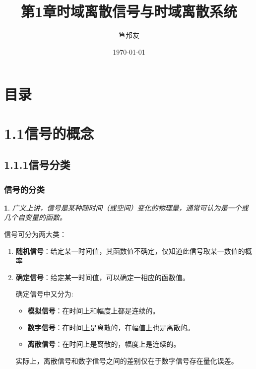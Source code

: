 \documentclass[notheorems,compress,mathserif,table]{beamer}
\title{\heiti 第1章\quad 时域离散信号与时域离散系统}
\author[\textcolor{blue}]{{\sihao\kaishu  笪邦友}}
\institute{\sihao\lishu  \textcolor{violet}{中南民族大学~~ 电子信息工程学院}}
\date{\fangsong\today}
\newtheorem{dablock}{}
\begin{document}
\kaishu
\frame{ \titlepage }
\section*{目录}


\section{1.1信号的概念}
\subsection{1.1.1信号分类}

\begin{frame}\frametitle{信号的分类}%
\begin{dablock}
广义上讲，信号是某种随时间（或空间）变化的物理量，通常可认为是一个或几个自变量的函数。
\end{dablock}
信号可分为两大类：

\begin{enumerate}
  \item [1] \textbf{随机信号}：给定某一时间值，其函数值不确定，仅知道此信号取某一数值的概率
  \item [2]
      \textbf{确定信号}：给定某一时间值，可以确定一相应的函数值。%
       \par 确定信号中又分为:
        \begin{itemize}
          \item  \textbf{模拟信号}：在时间上和幅度上都是连续的。
          \item  \textbf{数字信号}：在时间上是离散的，在幅值上也是离散的。%
          \item  \textbf{离散信号}：在时间上是离散的，幅度上是连续的。
        \end{itemize}
        实际上，离散信号和数字信号之间的差别仅在于数字信号存在量化误差。
\end{enumerate}
\end{frame}
%
%
%
%
%
%
\end{document}
